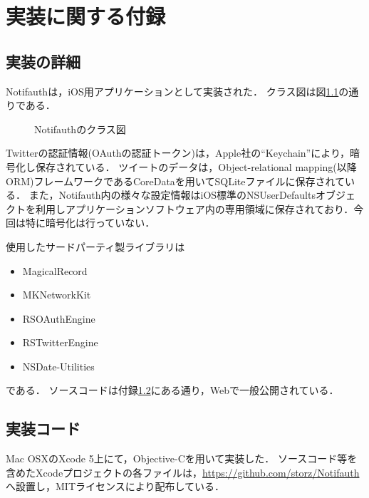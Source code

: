 \appendix
\chapter{実装に関する付録}\label{apdx:app}
\section{実装の詳細}
Notifauthは，iOS用アプリケーションとして実装された．
クラス図は図\ref{fig:notifauthClass}の通りである．

\begin{figure}[ht]
  \begin{center}
  \end{center}
  \caption{Notifauthのクラス図}
  \label{fig:notifauthClass}
\end{figure}

Twitterの認証情報(OAuthの認証トークン)は，Apple社の``Keychain''により，暗号化し保存されている．
ツイートのデータは，Object-relational mapping(以降ORM)フレームワークであるCoreDataを用いてSQLiteファイルに保存されている．
また，Notifauth内の様々な設定情報はiOS標準のNSUserDefaultsオブジェクトを利用しアプリケーションソフトウェア内の専用領域に保存されており．今回は特に暗号化は行っていない．

使用したサードパーティ製ライブラリは
\begin{itemize}
\item MagicalRecord
\item MKNetworkKit
\item RSOAuthEngine
\item RSTwitterEngine
\item NSDate-Utilities
\end{itemize}
である．
ソースコードは付録\ref{apdx:code}にある通り，Webで一般公開されている．

\section{実装コード}\label{apdx:code}
Mac OSXのXcode 5上にて，Objective-Cを用いて実装した．
ソースコード等を含めたXcodeプロジェクトの各ファイルは，\url{https://github.com/storz/Notifauth}へ設置し，MITライセンスにより配布している．


